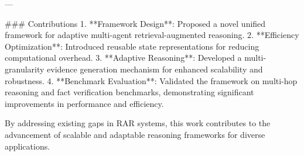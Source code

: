 ---

### Contributions
1. **Framework Design**: Proposed a novel unified framework for adaptive multi-agent retrieval-augmented reasoning.
2. **Efficiency Optimization**: Introduced reusable state representations for reducing computational overhead.
3. **Adaptive Reasoning**: Developed a multi-granularity evidence generation mechanism for enhanced scalability and robustness.
4. **Benchmark Evaluation**: Validated the framework on multi-hop reasoning and fact verification benchmarks, demonstrating significant improvements in performance and efficiency.

By addressing existing gaps in RAR systems, this work contributes to the advancement of scalable and adaptable reasoning frameworks for diverse applications.
